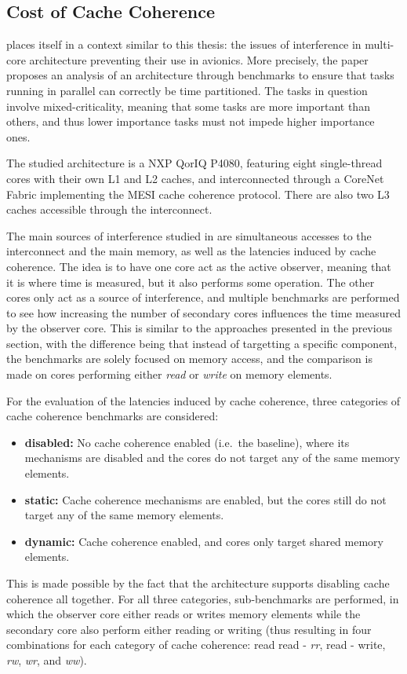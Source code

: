 \stopallthesefloats
\subsection{Cost of Cache Coherence}
\cite{Nowotsch2012LeveragingMC} places itself in a context similar to this
thesis: the issues of interference in multi-core architecture preventing their
use in avionics. More precisely, the paper proposes an analysis of an
architecture through benchmarks to ensure that tasks running in parallel can
correctly be time partitioned. The tasks in question involve mixed-criticality,
meaning that some tasks are more important than others, and thus lower
importance tasks must not impede higher importance ones.

The studied architecture is a NXP QorIQ P4080, featuring eight single-thread
cores with their own L1 and L2 caches, and interconnected through a CoreNet
Fabric implementing the MESI cache coherence protocol. There are also two L3
caches accessible through the interconnect.

The main sources of interference studied in \cite{Nowotsch2012LeveragingMC} are
simultaneous accesses to the interconnect and the main memory, as well as the
latencies induced by cache coherence. The idea is to have one core act as the
active observer, meaning that it is where time is measured, but it also performs
some operation. The other cores only act as a source of interference, and
multiple benchmarks are performed to see how increasing the number of secondary
cores influences the time measured by the observer core. This is similar to the
approaches presented in the previous section, with the difference being that
instead of targetting a specific component, the benchmarks are solely focused on
memory access, and the comparison is made on cores performing either
\textit{read} or \textit{write} on memory elements.

For the evaluation of the latencies induced by cache coherence, three categories
of cache coherence benchmarks are considered:
\begin{itemize}
\item \textbf{disabled:} No cache coherence enabled (i.e.~the baseline), where
its mechanisms are disabled and the cores do not target any of the same memory
elements.
\item \textbf{static:} Cache coherence mechanisms are enabled, but the cores
still do not target any of the same memory elements.
\item \textbf{dynamic:} Cache coherence enabled, and cores only target shared
memory elements.
\end{itemize}
This is made possible by the fact that the architecture supports disabling cache
coherence all together. For all three categories, sub-benchmarks are performed,
in which the observer core either reads or writes memory elements while the
secondary core also perform either reading or writing (thus resulting in four
combinations for each category of cache coherence: read read - \textit{rr}, read
- write, \textit{rw}, \textit{wr}, and \textit{ww}).

